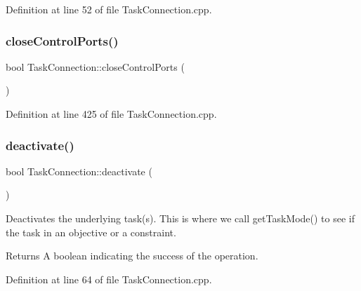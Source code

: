 Definition at line 52 of file Task\+Connection.\+cpp.

\hypertarget{classocra__recipes_1_1TaskConnection_abc322bd749033fad00193ca63701a1f5}{}\label{classocra__recipes_1_1TaskConnection_abc322bd749033fad00193ca63701a1f5} 
\subsubsection{\texorpdfstring{close\+Control\+Ports()}{closeControlPorts()}}
{\footnotesize\ttfamily bool Task\+Connection\+::close\+Control\+Ports (\begin{DoxyParamCaption}{ }\end{DoxyParamCaption})}



Definition at line 425 of file Task\+Connection.\+cpp.

\hypertarget{classocra__recipes_1_1TaskConnection_a8488250380b7fd9598f3246ec6111d6a}{}\label{classocra__recipes_1_1TaskConnection_a8488250380b7fd9598f3246ec6111d6a} 
\subsubsection{\texorpdfstring{deactivate()}{deactivate()}}
{\footnotesize\ttfamily bool Task\+Connection\+::deactivate (\begin{DoxyParamCaption}{ }\end{DoxyParamCaption})}

Deactivates the underlying task(s). This is where we call get\+Task\+Mode() to see if the task in an objective or a constraint.

\begin{DoxyReturn}{Returns}
A boolean indicating the success of the operation. 
\end{DoxyReturn}


Definition at line 64 of file Task\+Connection.\+cpp.

\hypertarget{classocra__recipes_1_1TaskConnection_a7d659e4a155f8a0942bb71d193b95385}{}\label{classocra__recipes_1_1TaskConnection_a7d659e4a155f8a0942bb71d193b95385} 
